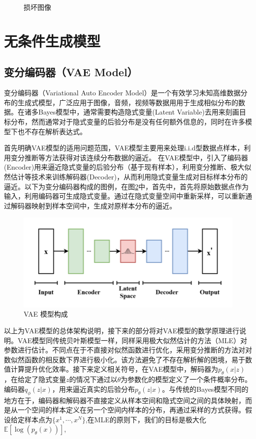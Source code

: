 \begin{figure}[H]
\begin{minipage}[b]{0.45\linewidth}
    \caption{损坏图像}
    \label{inpainted image}
  \end{minipage}
\end{figure}
\section{无条件生成模型}
\subsection{变分编码器（VAE Model）}
变分编码器（Variational Auto Encoder Model）是一个有效学习未知高维数据分布的生成式模型，广泛应用于图像，音频，视频等数据用用于生成相似分布的数据。在诸多Bayes模型中，通常需要构造隐式变量(Latent Variable)去用来刻画目标分布，然而通常对于隐式变量的后验分布是没有任何额外信息的，同时在许多模型下也不存在解析表达式。\par 
首先明确VAE模型的适用问题范围，VAE模型主要用来处理i.i.d型数据点样本，利用变分推断等方法获得对该连续分布数据的逼近。
在VAE模型中，引入了编码器(Encoder)用来逼近隐式变量的后验分布（基于现有样本），利用变分推断、极大似然估计等技术来训练解码器(Decoder)，从而利用隐式变量生成对目标样本分布的逼近。以下为变分编码器构成的图例，在图\ref{VAE model fig}中，首先中，首先将原始数据点作为输入，利用编码器可生成隐式变量。通过在隐式变量空间中重新采样，可以重新通过解码器映射到样本空间中，生成对原样本分布的逼近。
\begin{figure}[H]
    \centering
    \includegraphics[scale = 0.7]{ThuThesis_ Tsinghua University Thesis LaTeX Template/Picture/VAE.png}
    \caption{VAE 模型构成}
    \label{VAE model fig}
\end{figure}
以上为VAE模型的总体架构说明，接下来的部分将对VAE模型的数学原理进行说明。VAE模型同传统贝叶斯模型一样，同样采用极大似然估计的方法（MLE）对参数进行估计。不同点在于不直接对似然函数进行优化，采用变分推断的方法对对数似然函数的相反数下界进行极小化。该方法避免了不存在解析解的困境，易于数值计算提升优化效率。接下来定义相关符号，在VAE模型中，解码器为$p_{\theta}(x|z)$，在给定了隐式变量$z$的情况下通过以$\theta$为参数化的模型定义了一个条件概率分布。编码器$q_{\phi}(z|x)$，用来逼近真实的后验分布$p_{\theta}(z|x)$。与传统的Bayes模型不同的地方在于，编码器和解码器不直接定义从样本空间和隐式空间之间的具体映射，而是从一个空间的样本定义在另一个空间内样本的分布，再通过采样的方式获得。假设给定样本点为$\{x^1,\cdots,x^{N}\}$,在MLE的原则下，我们的目标是极大化$\mathbb{E}[\log(p_{\theta}(x))]$,
